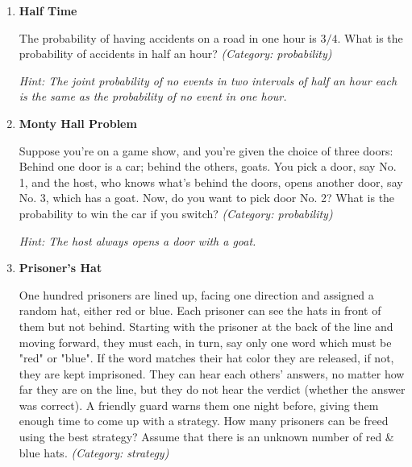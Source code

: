 \begin{enumerate}

\item \textbf{Half Time}

The probability of having accidents on a road in one hour is $3/4$. What is the probability of accidents in half an hour?
\small\emph{(Category: probability)}

\small\emph{Hint: The joint probability of no events in two intervals of half an hour each is the same as the probability of no event in one hour.}





\item \textbf{Monty Hall Problem}

Suppose you're on a game show, and you're given the choice of three doors: Behind one door is a car; behind the others, goats. You pick a door, say No. 1, and the host, who knows what's behind the doors, opens another door, say No. 3, which has a goat. Now, do you want to pick door No. 2? What is the probability to win the car if you switch?
\small\emph{(Category: probability)}

\small\emph{Hint: The host always opens a door with a goat.}





\item \textbf{Prisoner's Hat}

One hundred prisoners are lined up, facing one direction and assigned a random hat, either red or blue. Each prisoner can see the hats in front of them but not behind. Starting with the prisoner at the back of the line and moving forward, they must each, in turn, say only one word which must be "red" or "blue". If the word matches their hat color they are released, if not, they are kept imprisoned. They can hear each others' answers, no matter how far they are on the line, but they do not hear the verdict (whether the answer was correct). A friendly guard warns them one night before, giving them enough time to come up with a strategy.
How many prisoners can be freed using the best strategy?
Assume that there is an unknown number of red \& blue hats.
\small\emph{(Category: strategy)}


\end{enumerate}
